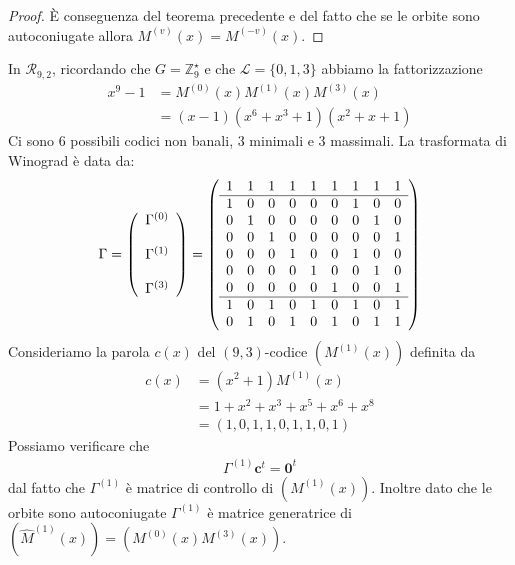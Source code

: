 \begin{proof}
    È conseguenza del teorema precedente e del fatto che se le orbite sono autoconiugate allora $M^{(v)}(x) = M^{(-v)}(x)$.
\end{proof}
\begin{esempio}
   In $\mathcal{R}_{9,2}$, ricordando che $ G = \mathbb{Z}_{9}^{\star}  $ e che $\mathscr{L} = \lbrace 0,1,3 \rbrace$ abbiamo la fattorizzazione
    \begin{align*}
      x^9 - 1 &= M^{(0)}(x) M^{(1)}(x) M^{(3)}(x) \\
	      &= (x-1)(x^6+x^3+1)(x^2+x+1)
    \end{align*}
   Ci sono $6$ possibili codici non banali, $3$ minimali e $3$ massimali.
   La trasformata di Winograd è data da:
   \begin{align*}
    \Gamma =
     \left(
    \begin{array} { c }
    \Gamma^{(0)} \\ \\
    \Gamma^{(1)} \\ \\
    \Gamma^{(3)}
    \end{array}
    \right)
    =
    \left(
    \begin{array} { c c c c c c c c c}
    1 & 1 & 1 & 1 & 1 & 1 & 1 & 1 & 1  \\
    \hline
    1 & 0 & 0 & 0 & 0 & 0 & 1 & 0 & 0  \\
    0 & 1 & 0 & 0 & 0 & 0 & 0 & 1 & 0  \\
    0 & 0 & 1 & 0 & 0 & 0 & 0 & 0 & 1 \\
    0 & 0 & 0 & 1 & 0 & 0 & 1 & 0 & 0 \\
    0 & 0 & 0 & 0 & 1 & 0 & 0 & 1 & 0 \\
    0 & 0 & 0 & 0 & 0 & 1 & 0 & 0 & 1 \\
    \hline
    1 & 0 & 1 & 0 & 1 & 0 & 1 & 0 & 1  \\
    0 & 1 & 0 & 1 & 0 & 1 & 0 & 1 & 1
    \end{array}
    \right)
    \end{align*}
    Consideriamo la parola $c(x)$ del $(9,3)$-codice $(M^{(1)}(x))$ definita da
    \begin{align*}
       c(x) &= (x^2 + 1)M^{(1)}(x) \\
            &= 1 + x^2 + x^3 + x^5 + x^6 + x^8 \\
            &= (1,0,1,1,0,1,1,0,1)
    \end{align*}
    Possiamo verificare che
    \begin{align*}
       \Gamma^{(1)} \mathbf{c}^{t} = \mathbf{0}^{t}
    \end{align*}
    dal fatto che $\Gamma^{(1)}$ è matrice di controllo di $(M^{(1)}(x))$. Inoltre dato che le orbite sono autoconiugate  $\Gamma^{(1)}$ è matrice generatrice di $(\hat{M}^{(1)}(x))=(M^{(0)}(x)M^{(3)}(x))$.
\end{esempio}

